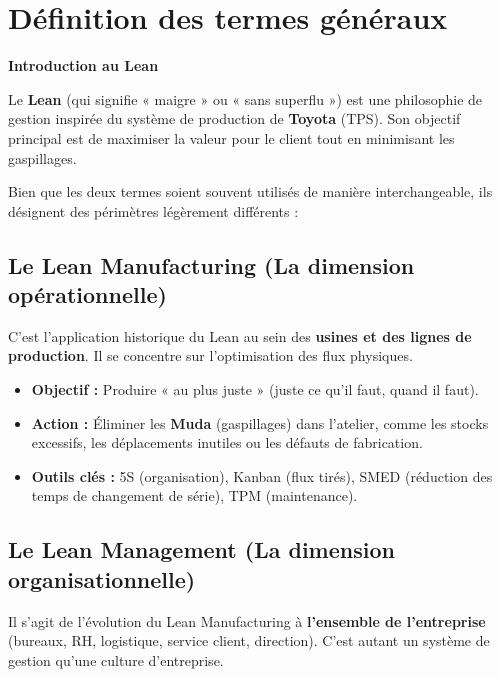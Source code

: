 \documentclass[11pt,a4paper]{article}
\newcommand{\subsectionbox}[1]{%
  \vspace{0.3em}
  \noindent\colorbox{secondcolor}{\parbox{\dimexpr\textwidth-2\fboxsep}{%
    \color{white}\large\bfseries #1%
  }}%
  \vspace{0.3em}
}
\begin{document}
\tableofcontents
\newpage


\section{Définition des termes généraux}

\subsectionbox{Introduction au Lean}

Le \textbf{Lean} (qui signifie « maigre » ou « sans superflu ») est une philosophie de gestion inspirée du système de production de \textbf{Toyota} (TPS). Son objectif principal est de maximiser la valeur pour le client tout en minimisant les gaspillages.

Bien que les deux termes soient souvent utilisés de manière interchangeable, ils désignent des périmètres légèrement différents :

\subsection{Le Lean Manufacturing (La dimension opérationnelle)}

C'est l'application historique du Lean au sein des \textbf{usines et des lignes de production}. Il se concentre sur l'optimisation des flux physiques.

\begin{itemize}[leftmargin=*,itemsep=0.3em]
  \item \textbf{Objectif :} Produire « au plus juste » (juste ce qu'il faut, quand il faut).
  \item \textbf{Action :} Éliminer les \textbf{Muda} (gaspillages) dans l'atelier, comme les stocks excessifs, les déplacements inutiles ou les défauts de fabrication.
  \item \textbf{Outils clés :} 5S (organisation), Kanban (flux tirés), SMED (réduction des temps de changement de série), TPM (maintenance).
\end{itemize}

\subsection{Le Lean Management (La dimension organisationnelle)}

Il s'agit de l'évolution du Lean Manufacturing à \textbf{l'ensemble de l'entreprise} (bureaux, RH, logistique, service client, direction). C'est autant un système de gestion qu'une culture d'entreprise.
\end{document}
